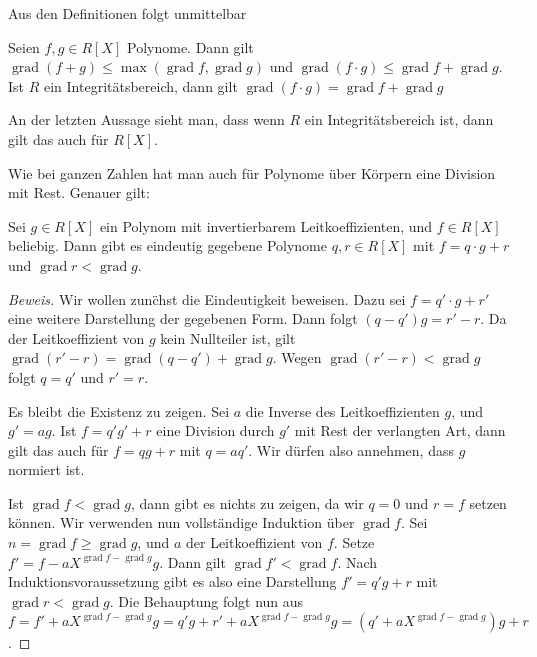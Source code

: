 \documentclass[12pt,a4paper,twoside]{article}
\DeclareMathOperator{\grad}{grad}
\begin{document}
Aus den Definitionen folgt unmittelbar

\begin{Lemma}
  Seien $f,g\in R[X]$ Polynome. Dann gilt $\grad(f+g)\le\max(\grad f,\grad g)$
  und $\grad(f\cdot g)\le\grad f+\grad g$. Ist $R$ ein Integrit\"atsbereich,
  dann gilt $\grad(f\cdot g)=\grad f+\grad g$
\end{Lemma}

An der letzten Aussage sieht man, dass wenn $R$ ein Integrit\"atsbereich ist,
dann gilt das auch f\"ur $R[X]$.

Wie bei ganzen Zahlen hat man auch f\"ur Polynome \"uber K\"orpern eine
Division mit Rest. Genauer gilt:

\begin{Satz}
  Sei $g\in R[X]$ ein Polynom mit invertierbarem Leitkoeffizienten, und $f\in
  R[X]$ beliebig. Dann gibt es eindeutig gegebene Polynome $q,r\in R[X]$ mit
  $f=q\cdot g+r$ und $\grad r<\grad g$.
\end{Satz}
\begin{proof}[Beweis]
Wir wollen zun\"chst die Eindeutigkeit beweisen. Dazu sei $f=q'\cdot g+r'$
eine weitere Darstellung der gegebenen Form. Dann folgt $(q-q')g=r'-r$. Da der
Leitkoeffizient von $g$ kein Nullteiler ist, gilt
$\grad(r'-r)=\grad(q-q')+\grad g$. Wegen $\grad(r'-r)<\grad g$ folgt $q=q'$
und $r'=r$.

Es bleibt die Existenz zu zeigen. Sei $a$ die Inverse des Leitkoeffizienten
$g$, und $g'=ag$. Ist $f=q'g'+r$ eine Division durch $g'$ mit Rest der
verlangten Art, dann gilt das auch f\"ur $f=qg+r$ mit $q=aq'$. Wir d\"urfen
also annehmen, dass $g$ normiert ist.

Ist $\grad f<\grad g$, dann gibt es nichts zu zeigen, da wir $q=0$ und $r=f$
setzen k\"onnen. Wir verwenden nun vollst\"andige Induktion \"uber $\grad f$.
Sei $n=\grad f\ge\grad g$, und $a$ der Leitkoeffizient von $f$. Setze
$f'=f-aX^{\grad f-\grad g}g$. Dann gilt $\grad f'<\grad f$. Nach
Induktionsvoraussetzung gibt es also eine Darstellung $f'=q'g+r$ mit $\grad
r<\grad g$. Die Behauptung folgt nun aus $f=f'+aX^{\grad f-\grad
  g}g=q'g+r'+aX^{\grad f-\grad g}g=(q'+aX^{\grad f-\grad g})g+r$.
\end{proof}
\end{document}
